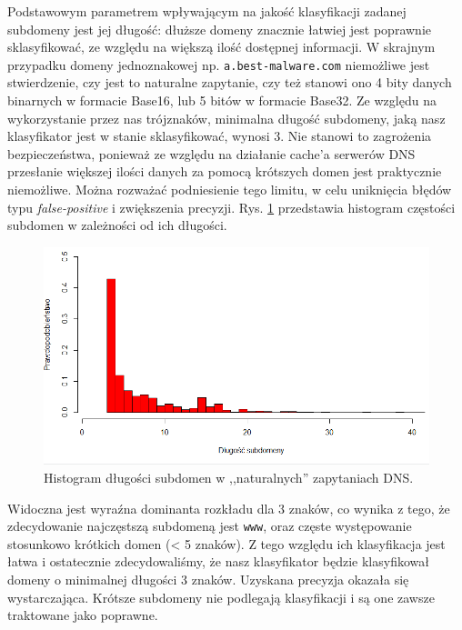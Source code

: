\documentclass{eiti-raport}
\begin{document}
Podstawowym parametrem wpływającym na jakość klasyfikacji zadanej subdomeny jest jej długość: dłuższe domeny znacznie łatwiej jest poprawnie sklasyfikować, ze względu na większą ilość dostępnej informacji. W skrajnym przypadku domeny jednoznakowej np. \texttt{a.best-malware.com} niemożliwe jest stwierdzenie, czy jest to naturalne zapytanie, czy też stanowi ono 4 bity danych binarnych w formacie Base16, lub 5 bitów w formacie Base32. Ze względu na wykorzystanie przez nas trójznaków, minimalna długość subdomeny, jaką nasz klasyfikator jest w stanie sklasyfikować, wynosi 3. Nie stanowi to zagrożenia bezpieczeństwa, ponieważ ze względu na działanie cache'a serwerów DNS przesłanie większej ilości danych za pomocą krótszych domen jest praktycznie niemożliwe. Można rozważać podniesienie tego limitu, w celu uniknięcia błędów typu \emph{false-positive} i zwiększenia precyzji. Rys. \ref{fig:length-hist} przedstawia histogram częstości subdomen w zależności od ich długości. 
\begin{figure}[!h] \centering
	\includegraphics[width=0.9\linewidth]{img/length-hist.PNG}
	\caption{Histogram długości subdomen w ,,naturalnych'' zapytaniach DNS.} \label{fig:length-hist}
\end{figure}
Widoczna jest wyraźna dominanta rozkładu dla 3 znaków, co wynika z tego, że zdecydowanie najczęstszą subdomeną jest \texttt{www}, oraz częste występowanie stosunkowo krótkich domen (< 5 znaków). Z tego względu ich klasyfikacja jest łatwa i ostatecznie zdecydowaliśmy, że nasz klasyfikator będzie klasyfikował domeny o minimalnej długości 3 znaków. Uzyskana precyzja okazała się wystarczająca. Krótsze subdomeny nie podlegają klasyfikacji i są one zawsze traktowane jako poprawne. 
\end{document}
